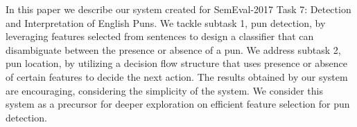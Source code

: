 In this paper we describe our system created for SemEval-2017 Task 7: Detection and Interpretation of English Puns. We tackle subtask 1, pun detection, by leveraging features selected from sentences to design a classifier that can disambiguate between the presence or absence of a pun. We address subtask 2, pun location, by utilizing a decision flow structure that uses presence or absence of certain features to decide the next action. The results obtained by our system are encouraging, considering the simplicity of the system. We consider this system as a precursor for deeper exploration on efficient feature selection for pun detection.
